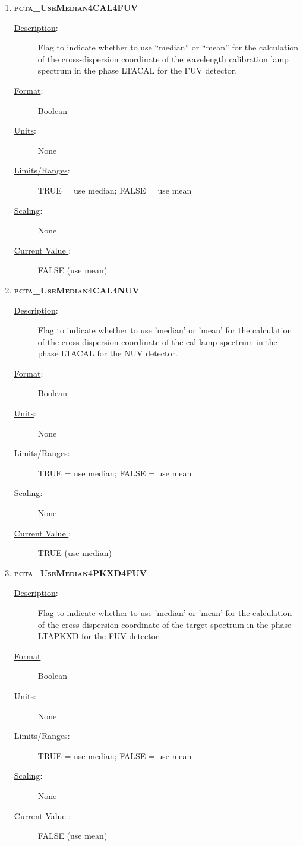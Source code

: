 \footnotesize
\begin{enumerate}
 \setlength{\itemsep}{1pt}
  \setlength{\parskip}{0pt}
  \setlength{\parsep}{0pt}

\item{\textsc{\bf pcta\_UseMedian4CAL4FUV}}
	\begin{description}
	\item[\underline{\rm Description}:]Flag to indicate whether to use ``median'' or ``mean'' for the calculation of the cross-dispersion coordinate of the wavelength calibration lamp spectrum in the phase \textsc{LTACAL} for the FUV detector.
	\item[\underline{\rm Format}:]    Boolean
	\item[\underline{\rm Units}:]     None
	\item[\underline{\rm Limits/Ranges}:]  TRUE = use median;  FALSE = use mean
	\item[\underline{\rm Scaling}:]   None
	\item[\underline{\rm Current Value }:]   FALSE (use mean)
\end{description}

\item{\textsc{\bf pcta\_UseMedian4CAL4NUV}}
	\begin{description}
	\item[\underline{\rm Description}:]Flag to indicate whether to use 'median' or 'mean' for the calculation of the cross-dispersion coordinate of the cal lamp spectrum in the phase \textsc{LTACAL} for the NUV detector.
	\item[\underline{\rm Format}:]    Boolean
	\item[\underline{\rm Units}:]     None
	\item[\underline{\rm Limits/Ranges}:]  TRUE = use median;  FALSE = use mean
	\item[\underline{\rm Scaling}:]   None
	\item[\underline{\rm Current Value }:]   TRUE (use median)
\end{description}

\item{\textsc{\bf pcta\_UseMedian4PKXD4FUV}}
	\begin{description}
	\item[\underline{\rm Description}:]Flag to indicate whether to use 'median' or 'mean' for the calculation of the cross-dispersion coordinate of the target spectrum in the phase \textsc{LTAPKXD} for the FUV detector.
	\item[\underline{\rm Format}:]    Boolean
	\item[\underline{\rm Units}:]     None
	\item[\underline{\rm Limits/Ranges}:]  TRUE = use median;  FALSE = use mean
	\item[\underline{\rm Scaling}:]   None
	\item[\underline{\rm Current Value }:]   FALSE (use mean)
\end{description}


\end{enumerate}
